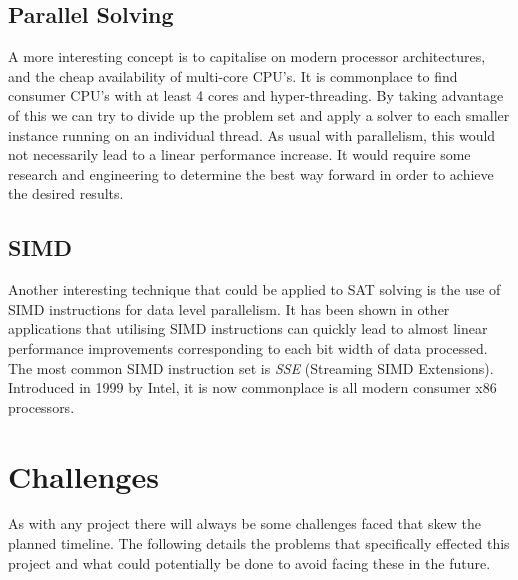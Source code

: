 \documentclass{article}
\begin{document}

\subsection{Parallel Solving}
A more interesting concept is to capitalise on modern processor architectures, and the cheap availability of multi-core CPU's. It 
is commonplace to find consumer CPU's with at least 4 cores and hyper-threading. By taking advantage of this we can try to divide 
up the problem set and apply a solver to each smaller instance running on an individual thread. As usual with parallelism, this 
would not necessarily lead to a linear performance increase. It would require some research and engineering to determine the best 
way forward in order to achieve the desired results.


\subsection{SIMD}
Another interesting technique that could be applied to SAT solving is the use of SIMD instructions for data level parallelism. It 
has been shown in other applications that utilising SIMD instructions can quickly lead to almost linear performance improvements 
corresponding to each bit width of data processed. The most common SIMD instruction set is \textit{SSE} (Streaming SIMD 
Extensions). Introduced in 1999 by Intel, it is now commonplace is all modern consumer x86 processors.


\section{Challenges}
As with any project there will always be some challenges faced that skew the planned timeline. The following details the problems
that specifically effected this project and what could potentially be done to avoid facing these in the future.
\end{document}
